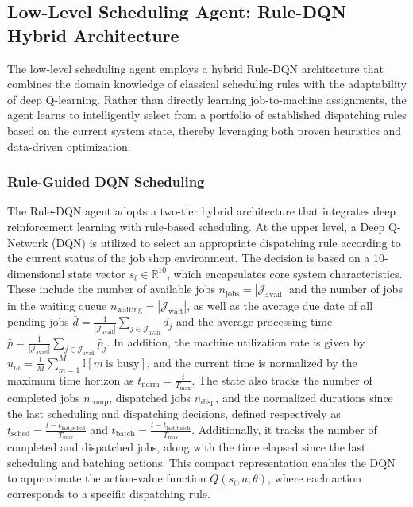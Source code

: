 \documentclass{article}
\begin{document}
\subsection{Low-Level Scheduling Agent: Rule-DQN Hybrid Architecture}

The low-level scheduling agent employs a hybrid Rule-DQN architecture that combines the domain knowledge of classical scheduling rules with the adaptability of deep Q-learning. Rather than directly learning job-to-machine assignments, the agent learns to intelligently select from a portfolio of established dispatching rules based on the current system state, thereby leveraging both proven heuristics and data-driven optimization.

\subsubsection{Rule-Guided DQN Scheduling}
The Rule-DQN agent adopts a two-tier hybrid architecture that integrates deep reinforcement learning with rule-based scheduling. At the upper level, a Deep Q-Network (DQN) is utilized to select an appropriate dispatching rule according to the current status of the job shop environment. The decision is based on a 10-dimensional state vector \( s_t \in \mathbb{R}^{10} \), which encapsulates core system characteristics. These include the number of available jobs \( n_{\text{jobs}} = |\mathcal{J}_{\text{avail}}| \) and the number of jobs in the waiting queue \( n_{\text{waiting}} = |\mathcal{J}_{\text{wait}}| \), as well as the average due date of all pending jobs \( \bar{d} = \frac{1}{|\mathcal{J}_{\text{avail}}|} \sum_{j \in \mathcal{J}_{\text{avail}}} d_j \) and the average processing time \( \bar{p} = \frac{1}{|\mathcal{J}_{\text{avail}}|} \sum_{j \in \mathcal{J}_{\text{avail}}} \bar{p}_j \). In addition, the machine utilization rate is given by \( u_m = \frac{1}{M} \sum_{m=1}^M \mathbb{I}[m\ \text{is busy}] \), and the current time is normalized by the maximum time horizon as \( t_{\text{norm}} = \frac{t}{T_{\max}} \). The state also tracks the number of completed jobs \( n_{\text{comp}} \), dispatched jobs \( n_{\text{disp}} \), and the normalized durations since the last scheduling and dispatching decisions, defined respectively as \( t_{\text{sched}} = \frac{t - t_{\text{last\_sched}}}{T_{\max}} \) and \( t_{\text{batch}} = \frac{t - t_{\text{last\_batch}}}{T_{\max}} \). Additionally, it tracks the number of completed and dispatched jobs, along with the time elapsed since the last scheduling and batching actions. This compact representation enables the DQN to approximate the action-value function \( Q(s_t, a; \theta) \), where each action corresponds to a specific dispatching rule.
\end{document}
